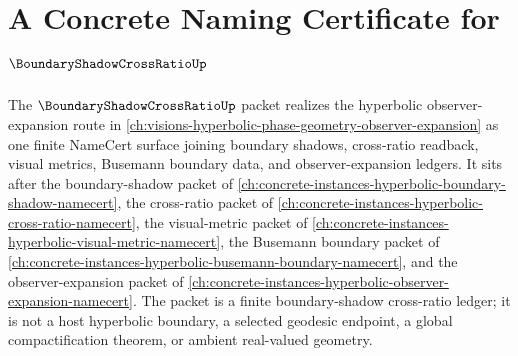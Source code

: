 \chapter{A Concrete Naming Certificate for $\BoundaryShadowCrossRatioUp$}
\label{ch:concrete-instances-boundary-shadow-cross-ratio-namecert}

The $\BoundaryShadowCrossRatioUp$ packet realizes the hyperbolic observer-expansion route in \autoref{ch:visions-hyperbolic-phase-geometry-observer-expansion} as one finite NameCert surface joining boundary shadows, cross-ratio readback, visual metrics, Busemann boundary data, and observer-expansion ledgers. It sits after the boundary-shadow packet of \autoref{ch:concrete-instances-hyperbolic-boundary-shadow-namecert}, the cross-ratio packet of \autoref{ch:concrete-instances-hyperbolic-cross-ratio-namecert}, the visual-metric packet of \autoref{ch:concrete-instances-hyperbolic-visual-metric-namecert}, the Busemann boundary packet of \autoref{ch:concrete-instances-hyperbolic-busemann-boundary-namecert}, and the observer-expansion packet of \autoref{ch:concrete-instances-hyperbolic-observer-expansion-namecert}. The packet is a finite boundary-shadow cross-ratio ledger; it is not a host hyperbolic boundary, a selected geodesic endpoint, a global compactification theorem, or ambient real-valued geometry.



